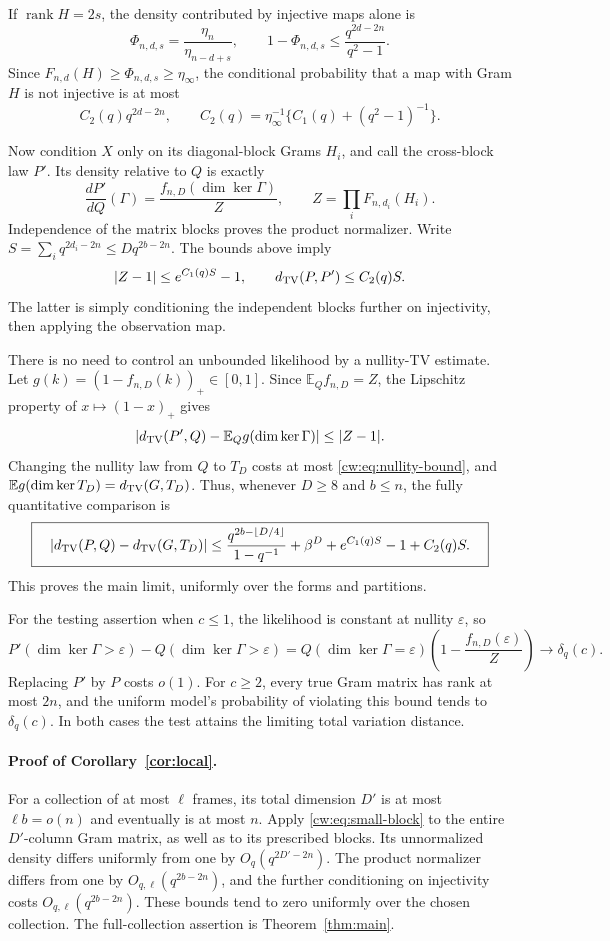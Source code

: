 \documentclass[11pt,letterpaper]{article}
\begin{document}
If $\operatorname{rank}H=2s$, the density contributed by injective maps
alone is
\[
 \Phi_{n,d,s}=\frac{\eta_n}{\eta_{n-d+s}},\qquad
 1-\Phi_{n,d,s}\le\frac{q^{2d-2n}}{q^2-1}.
\]
Since $F_{n,d}(H)\ge\Phi_{n,d,s}\ge\eta_\infty$, the conditional
probability that a map with Gram $H$ is not injective is at most
\begin{equation}\label{cw:eq:inj-cost}
 C_2(q)q^{2d-2n},\qquad
 C_2(q)=\eta_\infty^{-1}\{C_1(q)+(q^2-1)^{-1}\}.
\end{equation}

Now condition $X$ only on its diagonal-block Grams $H_i$, and call the
cross-block law $P'$. Its density relative to $Q$ is exactly
\[
 \frac{dP'}{dQ}(\Gamma)=\frac{f_{n,D}(\dim\ker\Gamma)}{Z},
 \qquad Z=\prod_i F_{n,d_i}(H_i).
\]
Independence of the matrix blocks proves the product normalizer. Write
$S=\sum_i q^{2d_i-2n}\le Dq^{2b-2n}$. The bounds above imply
\[
 |Z-1|\le e^{C_1(q)S}-1,\qquad
 d_{\rm TV}(P,P')\le C_2(q)S.
\]
The latter is simply conditioning the independent blocks further on
injectivity, then applying the observation map.

There is no need to control an unbounded likelihood by a nullity-TV
estimate. Let $g(k)=(1-f_{n,D}(k))_+\in[0,1]$. Since
$\mathbb E_Q f_{n,D}=Z$, the Lipschitz property of $x\mapsto(1-x)_+$
gives
\[
 \left|d_{\rm TV}(P',Q)-\mathbb E_Q g(\dim\ker\Gamma)\right|
 \le |Z-1|.
\]
Changing the nullity law from $Q$ to $T_D$ costs at most
\eqref{cw:eq:nullity-bound}, and
$\mathbb E g(\dim\ker T_D)=d_{\rm TV}(G,T_D)$.
Thus, whenever $D\ge8$ and $b\le n$, the fully quantitative comparison is
\[
 \boxed{\quad
 |d_{\rm TV}(P,Q)-d_{\rm TV}(G,T_D)|
 \le \frac{q^{2b-\lfloor D/4\rfloor}}{1-q^{-1}}+\beta^D
       +e^{C_1(q)S}-1+C_2(q)S .\quad}
\]
This proves the main limit, uniformly over the forms and partitions.

For the testing assertion when $c\le1$, the likelihood is constant at
nullity $\varepsilon$, so
\[
 P'(\dim\ker\Gamma>\varepsilon)-Q(\dim\ker\Gamma>\varepsilon)
 =Q(\dim\ker\Gamma=\varepsilon)
   \left(1-\frac{f_{n,D}(\varepsilon)}Z\right)
 \longrightarrow\delta_q(c).
\]
Replacing $P'$ by $P$ costs $o(1)$. For $c\ge2$, every true Gram matrix
has rank at most $2n$, and the uniform model's probability of violating
this bound tends to $\delta_q(c)$. In both cases the test attains the
limiting total variation distance.


\paragraph{Proof of Corollary~\ref{cor:local}.}
For a collection of at most $\ell$ frames, its total dimension $D'$ is at
most $\ell b=o(n)$ and eventually is at most $n$. Apply
\eqref{cw:eq:small-block} to the entire $D'$-column Gram matrix, as well
as to its prescribed blocks. Its unnormalized density differs uniformly
from one by $O_q(q^{2D'-2n})$. The product normalizer differs from one by
$O_{q,\ell}(q^{2b-2n})$, and the further conditioning on injectivity costs
$O_{q,\ell}(q^{2b-2n})$. These bounds tend to zero uniformly over the
chosen collection. The full-collection assertion is Theorem~\ref{thm:main}.
\end{document}
